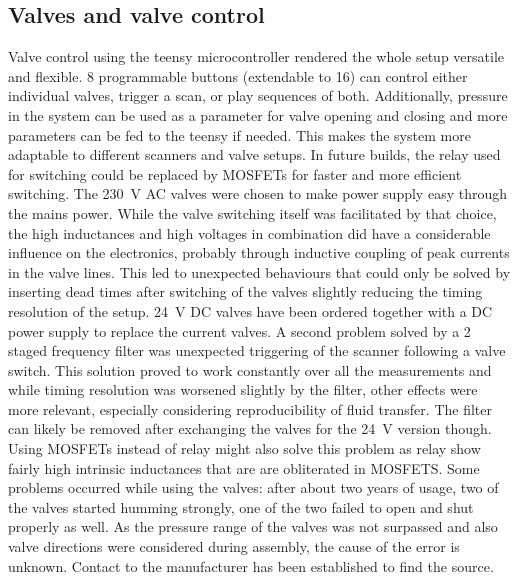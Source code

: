         \subsection{Valves and valve control}
            Valve control using the teensy microcontroller rendered the whole setup versatile and flexible. 8 programmable buttons (extendable to 16) can control either individual valves, trigger a scan, or play sequences of both. Additionally, pressure in the system can be used as a parameter for valve opening and closing and more parameters can be fed to the teensy if needed. This makes the system more adaptable to different scanners and valve setups. In future builds, the relay used for switching could be replaced by MOSFETs for faster and more efficient switching. 
            The \SI{230}{\volt} AC valves were chosen to make power supply easy through the mains power. While the valve switching itself was facilitated by that choice, the high inductances and high voltages in combination did have a considerable influence on the electronics, probably through inductive coupling of peak currents in the valve lines. This led to unexpected behaviours that could only be solved by inserting dead times after switching of the valves slightly reducing the timing resolution of the setup. \SI{24}{\volt} DC valves have been ordered together with a DC power supply to replace the current valves. A second problem solved by a 2 staged frequency filter was unexpected triggering of the scanner following a valve switch. This solution proved to work constantly over all the measurements and while timing resolution was worsened slightly by the filter, other effects were more relevant, especially considering reproducibility of fluid transfer. The filter can likely be removed after exchanging the valves for the \SI{24}{\volt} version though. Using MOSFETs instead of relay might also solve this problem as relay show fairly high intrinsic inductances that are are obliterated in MOSFETS. 
            Some problems occurred while using the valves: after about two years of usage, two of the valves started humming strongly, one of the two failed to open and shut properly as well. As the pressure range of the valves was not surpassed and also valve directions were considered during assembly, the cause of the error is unknown. Contact to the manufacturer has been established to find the source.
